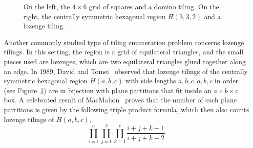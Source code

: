 \documentclass{article}
\begin{document}
\begin{figure}[h]
\begin{minipage}{0.49\textwidth}
\begin{center}
\end{center}
\end{minipage}
    \caption{On the left, the $4\times 6$ grid of squares and a domino tiling. On the right, the centrally symmetric hexagonal region $H(3,3,2)$ and a lozenge tiling.}\label{fig:domloz}
\end{figure}

Another commonly studied type of tiling enumeration problem concerns lozenge tilings. In this setting, the region is a grid of equilateral triangles, and the small pieces used are lozenges, which are two equilateral triangles glued together along an edge. In 1989, David and Tomei~\cite{DT} observed that lozenge tilings of the centrally symmetric hexagonal region $H(a,b,c)$ with side lengths $a,b,c,a,b,c$ in order (see Figure~\ref{fig:domloz}) are in bijection with plane partitions that fit inside an $a\times b\times c$ box. A celebrated result of MacMahon~\cite{M} proves that the number of such plane partitions is given by the following triple product formula, which then also counts lozenge tilings of $H(a,b,c)$, 
\[\prod_{i=1}^a\prod_{j=1}^b\prod_{k=1}^c\frac{i+j+k-1}{i+j+k-2}.\]
\end{document}
